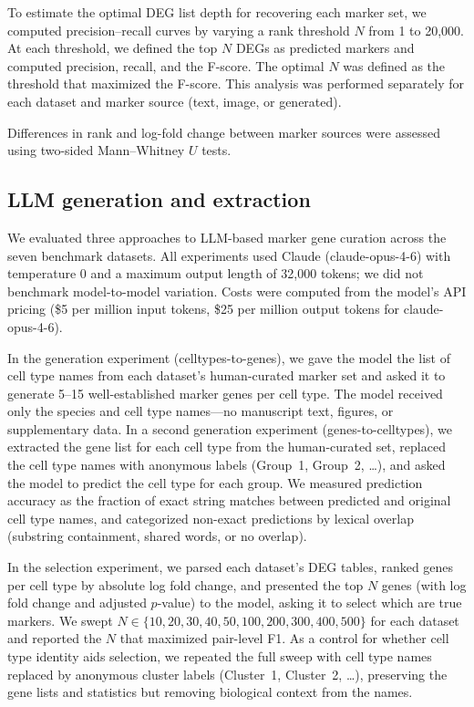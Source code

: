\documentclass[10pt,twocolumn]{article}
\theoremstyle{plain}
\theoremstyle{definition}
\theoremstyle{remark}
\begin{document}
To estimate the optimal DEG list depth for recovering each marker set, we computed precision--recall curves by varying a rank threshold $N$ from 1 to 20{,}000. At each threshold, we defined the top $N$ DEGs as predicted markers and computed precision, recall, and the F-score. The optimal $N$ was defined as the threshold that maximized the F-score. This analysis was performed separately for each dataset and marker source (text, image, or generated).

Differences in rank and log-fold change between marker sources were assessed using two-sided Mann--Whitney $U$ tests.


\subsection{LLM generation and extraction}

We evaluated three approaches to LLM-based marker gene curation across the seven benchmark datasets. All experiments used Claude (claude-opus-4-6) with temperature 0 and a maximum output length of 32{,}000 tokens; we did not benchmark model-to-model variation. Costs were computed from the model's API pricing (\$5 per million input tokens, \$25 per million output tokens for claude-opus-4-6).

In the generation experiment (celltypes-to-genes), we gave the model the list of cell type names from each dataset's human-curated marker set and asked it to generate 5--15 well-established marker genes per cell type. The model received only the species and cell type names---no manuscript text, figures, or supplementary data. In a second generation experiment (genes-to-celltypes), we extracted the gene list for each cell type from the human-curated set, replaced the cell type names with anonymous labels (Group~1, Group~2, \ldots), and asked the model to predict the cell type for each group. We measured prediction accuracy as the fraction of exact string matches between predicted and original cell type names, and categorized non-exact predictions by lexical overlap (substring containment, shared words, or no overlap).

In the selection experiment, we parsed each dataset's DEG tables, ranked genes per cell type by absolute log fold change, and presented the top $N$ genes (with log fold change and adjusted $p$-value) to the model, asking it to select which are true markers. We swept $N \in \{10, 20, 30, 40, 50, 100, 200, 300, 400, 500\}$ for each dataset and reported the $N$ that maximized pair-level F1. As a control for whether cell type identity aids selection, we repeated the full sweep with cell type names replaced by anonymous cluster labels (Cluster~1, Cluster~2, \ldots), preserving the gene lists and statistics but removing biological context from the names.
\end{document}
